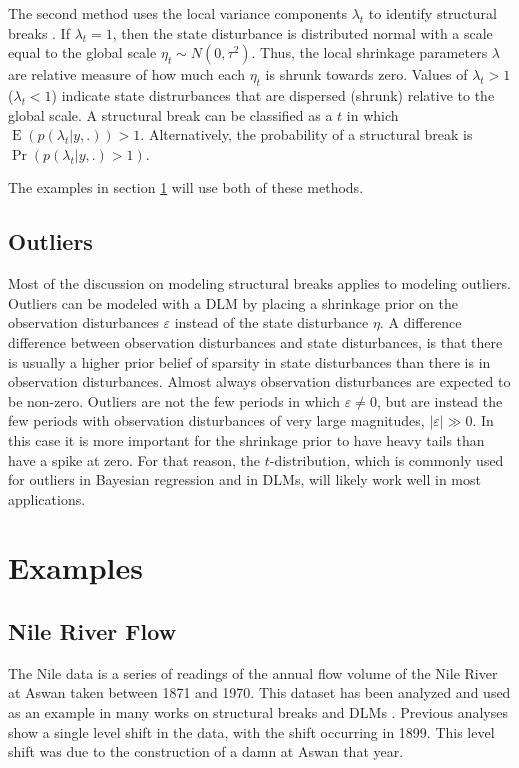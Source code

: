 \documentclass{article}
\DeclareMathOperator{\E}{E}
\begin{document}
The second method uses the local variance components $\lambda_{t}$ to identify structural breaks \parencite[179-180]{PetrisPetroneEtAl2009}.
If $\lambda_{t} = 1$, then the state disturbance is distributed normal with a scale equal to the global scale $\eta_{t} \sim N(0, \tau^{2})$.
Thus, the local shrinkage parameters $\lambda$ are relative measure of how much each $\eta_{t}$ is shrunk towards zero.
Values of $\lambda_{t} > 1$ ($\lambda_{t} < 1$) indicate state distrurbances that are dispersed (shrunk) relative to the global scale.
A structural break can be classified as a $t$ in which $\E (p(\lambda_{t} | y, .)) > 1$.
Alternatively, the probability of a structural break is $\Pr(p(\lambda_{t} | y, .) > 1)$.

The examples in section \ref{sec:examples} will use both of these methods.

\subsection{Outliers}
\label{sec:outliers}

Most of the discussion on modeling structural breaks applies to modeling outliers.
Outliers can be modeled with a DLM by placing a shrinkage prior on the observation disturbances $\varepsilon$ instead of the state disturbance $\eta$.
A difference difference between observation disturbances and state disturbances, is that there is usually a higher prior belief of sparsity in state disturbances than there is in observation disturbances. 
Almost always observation disturbances are expected to be non-zero.
Outliers are not the few periods in which $\varepsilon \neq 0$, but are instead the few periods with observation disturbances of very large magnitudes, $|\varepsilon| \gg 0$.
In this case it is more important for the shrinkage prior to have heavy tails than have a spike at zero.
For that reason, the $t$-distribution, which is commonly used for outliers in Bayesian regression and in DLMs, will likely work well in most applications.

\section{Examples}
\label{sec:examples}


\subsection{Nile River Flow}
\label{sec:nile}

The Nile data is a series of readings of the annual flow volume of the Nile River at Aswan taken between 1871 and 1970.
This dataset has been analyzed and used as an example in many works on structural breaks and DLMs \parencites{Cobb1978}{Balke1993}{JongPenzer1998}{DurbinKoopman2001}{DurbinKoopman2012}.
Previous analyses show a single level shift in the data, with the shift occurring in 1899.
This level shift was due to the construction of a damn at Aswan that year.
\end{document}
